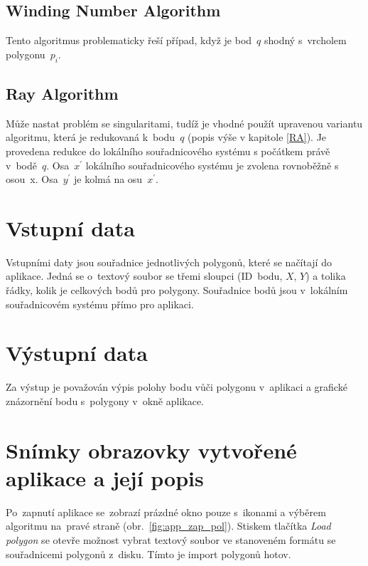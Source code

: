 \documentclass[a4paper, 12pt, oneside, titlepage]{article} %
\begin{document}
\subsection{Winding Number Algorithm}
Tento algoritmus problematicky řeší případ, když je bod~$q$ shodný s~vrcholem polygonu~$p_i$.

\subsection{Ray Algorithm} \label{RA_problem}
Může nastat problém se singularitami, tudíž je vhodné použít upravenou variantu algoritmu, která je redukovaná k~bodu~$q$ (popis výše v kapitole \ref{RA}). Je provedena redukce do lokálního souřadnicového systému s počátkem právě v~bodě~$q$. Osa~$x^{'}$ lokálního souřadnicového systému je zvolena rovnoběžně s osou~x. Osa~$y^{'}$ je kolmá na osu~$x^{'}$.

\section{Vstupní data}
Vstupními daty jsou souřadnice jednotlivých polygonů, které se načítají do aplikace. Jedná se o~textový soubor se třemi sloupci (ID~bodu, $X$, $Y$) a tolika řádky, kolik je celkových bodů pro polygony. Souřadnice bodů jsou v~lokálním souřadnicovém systému přímo pro aplikaci.


\section{Výstupní data}
Za výstup je považován výpis polohy bodu vůči polygonu v~aplikaci a grafické znázornění bodu s~polygony v~okně aplikace. 

\section{Snímky obrazovky vytvořené aplikace a její popis}
Po~zapnutí aplikace se~zobrazí prázdné okno pouze s~ikonami a výběrem algoritmu na~pravé straně (obr.~\ref{fig:app_zap_pol}). Stiskem tlačítka \emph{Load polygon} se otevře možnost vybrat textový soubor ve stanoveném formátu se souřadnicemi polygonů z~disku. Tímto je import polygonů hotov. 
\end{document}
